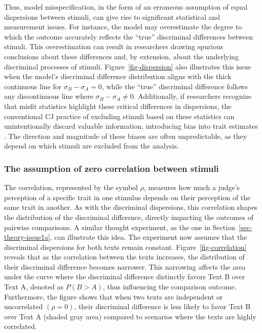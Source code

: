 \documentclass[
  authoryear,
  review,
  1p]{elsarticle}
\begin{document}
Thus, model misspecification, in the form of an erroneous assumption of
equal dispersions between stimuli, can give rise to significant
statistical and measurement issues. For instance, the model may
overestimate the degree to which the outcome accurately reflects the
``true'' discriminal differences between stimuli. This overestimation
can result in researchers drawing spurious conclusions about these
differences \citep[pp.~370]{McElreath_2020} and, by extension, about the
underlying discriminal processes of stimuli. Figure~\ref{fig-dispersion}
also illustrates this issue when the model's discriminal difference
distribution aligns with the thick continuous line for
\(\sigma_{B}-\sigma_{A}=0\), while the ``true'' discriminal difference
follows any discontinuous line where \(\sigma_{B}-\sigma_{A} \neq 0\).
Additionally, if researchers recognize that misfit statistics highlight
these critical differences in dispersions, the conventional CJ practice
of excluding stimuli based on these statistics
\citep{Pollitt_2012a, Pollitt_2012b, vanDaal_et_al_2016, Goossens_et_al_2018}
can unintentionally discard valuable information, introducing bias into
trait estimates \citep[chap.~12]{Zimmerman_1994, McElreath_2020}. The
direction and magnitude of these biases are often unpredictable, as they
depend on which stimuli are excluded from the analysis.

\subsubsection{The assumption of zero correlation between
stimuli}\label{sec-theory-issue1b}

The correlation, represented by the symbol \(\rho\), measures how much a
judge's perception of a specific trait in one stimulus depends on their
perception of the same trait in another. As with the discriminal
dispersions, this correlation shapes the distribution of the discriminal
difference, directly impacting the outcomes of pairwise comparisons. A
similar thought experiment, as the one in
Section~\ref{sec-theory-issue1a}, can illustrate this idea. The
experiment now assumes that the discriminal dispersions for both texts
remain constant. Figure~\ref{fig-correlation} reveals that as the
correlation between the texts increases, the distribution of their
discriminal difference becomes narrower. This narrowing affects the area
under the curve where the discriminal difference distinctly favors Text
B over Text A, denoted as \(P(B > A)\), thus influencing the comparison
outcome. Furthermore, the figure shows that when two texts are
independent or uncorrelated \((\rho=0)\), their discriminal difference
is less likely to favor Text B over Text A (shaded gray area) compared
to scenarios where the texts are highly correlated.
\end{document}
